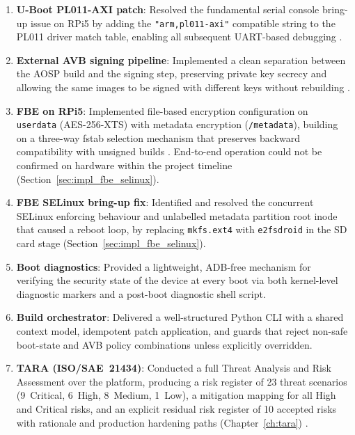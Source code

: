 \begin{enumerate}
    \item \textbf{U-Boot PL011-AXI patch}: Resolved the fundamental serial console bring-up issue on RPi5 by adding the \texttt{"arm,pl011-axi"} compatible string to the PL011 driver match table, enabling all subsequent UART-based debugging \cite{arm_pl011_trm, uboot_serial_pl01x}.

    \item \textbf{External AVB signing pipeline}: Implemented a clean separation between the AOSP build and the signing step, preserving private key secrecy and allowing the same images to be signed with different keys without rebuilding \cite{avb2_readme}.

    \item \textbf{FBE on RPi5}: Implemented file-based encryption configuration on \texttt{userdata} (AES-256-XTS) with metadata encryption (\texttt{/metadata}), building on a three-way fstab selection mechanism that preserves backward compatibility with unsigned builds \cite{android_fbe}. End-to-end operation could not be confirmed on hardware within the project timeline (Section~\ref{sec:impl_fbe_selinux}).

    \item \textbf{FBE SELinux bring-up fix}: Identified and resolved the concurrent SELinux enforcing behaviour and unlabelled metadata partition root inode that caused a reboot loop, by replacing \texttt{mkfs.ext4} with \texttt{e2fsdroid} in the SD card stage (Section~\ref{sec:impl_fbe_selinux}).

    \item \textbf{Boot diagnostics}: Provided a lightweight, ADB-free mechanism for verifying the security state of the device at every boot via both kernel-level diagnostic markers and a post-boot diagnostic shell script.

    \item \textbf{Build orchestrator}: Delivered a well-structured Python CLI with a shared context model, idempotent patch application, and guards that reject non-safe boot-state and AVB policy combinations unless explicitly overridden.

    \item \textbf{TARA (ISO/SAE~21434)}: Conducted a full Threat Analysis and Risk Assessment over the platform, producing a risk register of 23 threat scenarios (9~Critical, 6~High, 8~Medium, 1~Low), a mitigation mapping for all High and Critical risks, and an explicit residual risk register of 10 accepted risks with rationale and production hardening paths (Chapter~\ref{ch:tara}) \cite{iso_sae_21434}.
\end{enumerate}

